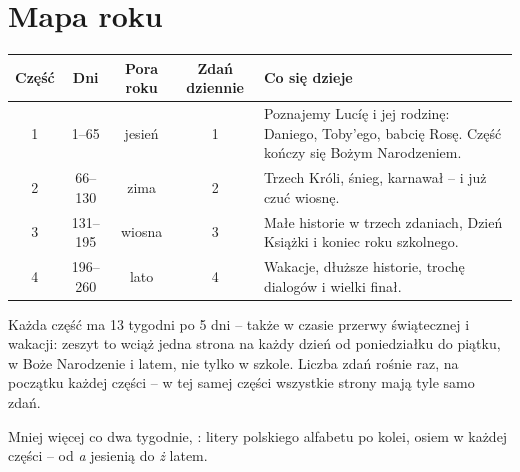 \section*{Mapa roku}

\begin{center}
\renewcommand{\arraystretch}{1.4}
\begin{tabularx}{\linewidth}{@{}c c c c >{\raggedright\arraybackslash}X@{}}
\toprule
\textbf{Część} & \textbf{Dni} & \textbf{Pora roku} & \textbf{Zdań dziennie} & \textbf{Co się dzieje} \\
\midrule
1 & 1--65   & jesień & 1 & Poznajemy Lucíę i jej rodzinę: Daniego,
Toby'ego, babcię Rosę. Część kończy się Bożym Narodzeniem. \\
2 & 66--130 & zima & 2 & Trzech Króli, śnieg, karnawał -- i już czuć
wiosnę. \\
3 & 131--195 & wiosna & 3 & Małe historie w trzech zdaniach, Dzień
Książki i koniec roku szkolnego. \\
4 & 196--260 & lato & 4 & Wakacje, dłuższe historie, trochę dialogów i
wielki finał. \\
\bottomrule
\end{tabularx}
\end{center}

\vspace{6mm}
Każda część ma 13 tygodni po 5 dni -- także w czasie przerwy
świątecznej i wakacji: zeszyt to wciąż jedna strona na każdy dzień od
poniedziałku do piątku, w Boże Narodzenie i latem, nie tylko w szkole.
Liczba zdań rośnie raz, na początku każdej części -- w tej samej części
wszystkie strony mają tyle samo zdań.

Mniej więcej co dwa tygodnie, \emph{\lblTraza}: litery polskiego
alfabetu po kolei, osiem w każdej części -- od \emph{a} jesienią do
\emph{ż} latem.
\newpage
